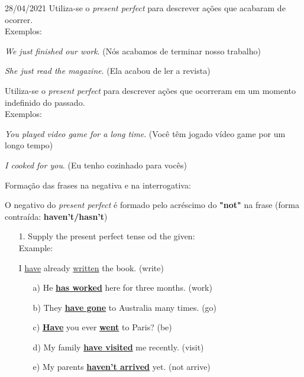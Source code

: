 \documentclass{SchoolBook}
\begin{document}
\begin{day}{28/04/2021}
        \vspace{12pt}
        \noindent Utiliza-se o \emph{present perfect} para descrever ações que acabaram de ocorrer. \\
        Exemplos:
        
        \emph{We  just finished our work}. (Nós acabamos de terminar nosso trabalho)
        
        \emph{She  just read the magazine}. (Ela acabou de ler a revista)
        
        \vspace{12pt}
        \noindent Utiliza-se o \emph{present perfect} para descrever ações que ocorreram em um momento indefinido do passado. \\
        Exemplos:
        
        \emph{You  played video game for a long time}. (Você têm jogado vídeo game por um longo tempo)
        
        \emph{I  cooked for you}. (Eu tenho cozinhado para vocês)
        
        \vspace{12pt}
        \noindent Formação das frases na negativa e na interrogativa:
        
        \noindent O negativo do \emph{present perfect} é formado pelo acréscimo do \textbf{"not"} na frase (forma contraída: \textbf{haven't/hasn't})
        
        \begin{enumerate}
            \item[1.] Supply the present perfect tense od the given: \\
            Example:
            
            I \underline{have} already \underline{written} the book. (write)
            
            \begin{enumerate}[nosep]
                \item[a)] He \underline{\bf has worked} here for three months. (work)
                \item[b)] They \underline{\bf have gone} to Australia many times. (go)
                \item[c)] \underline{\bf Have} you ever \underline{\bf went} to Paris? (be)
                \item[d)] My family \underline{\bf have visited} me recently. (visit)
                \item[e)] My parents \underline{\bf haven't arrived} yet. (not arrive)
            \end{enumerate}
        \end{enumerate}
    \end{day}
    
\end{document}
